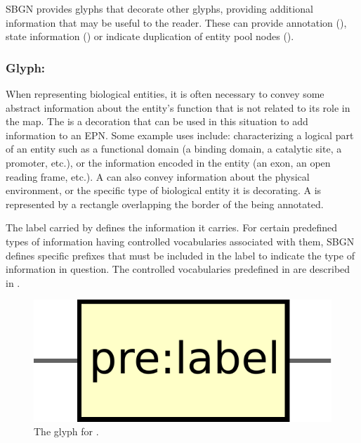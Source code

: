 SBGN \PD provides glyphs that decorate other glyphs, providing additional information that may be useful to the reader. These can provide annotation (\hyperref[sec:unitInfo]{}), state information (\hyperref[sec:stateVariable]{}) or indicate duplication of entity pool nodes (\hyperref[sec:cloneMarker]{}).

\subsubsection{Glyph: }
\label{sec:unitInfo}

When representing biological entities, it is often necessary to convey some abstract information about the entity's function that is not related to its role in the map.  The  is a decoration that can be used in this situation to add information to an EPN.  Some example uses include: characterizing a logical part of an entity such as a functional domain (a binding domain, a catalytic site, a promoter, etc.), or the information encoded in the entity (an exon, an open reading frame, etc.).  A  can also convey information about the physical environment, or the specific type of biological entity it is decorating. A  is represented by a rectangle overlapping the border of the  being annotated.

The label carried by  defines the information it carries.  For certain predefined types of information having controlled vocabularies associated with them, SBGN defines specific prefixes that must be included in the label to indicate the type of information in question.  The controlled vocabularies predefined in \SBGNPDLone are described in .

\begin{figure}[H]
  \centering
  \includegraphics[scale = 0.3]{le_images/unitInformation}
  \caption{The \PD glyph for .}
  \label{fig:unitInfo}
\end{figure}


